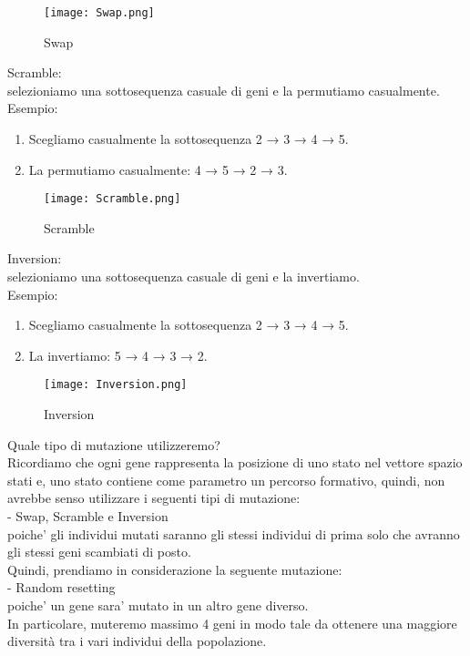 \documentclass[10pt,a4paper]{article}
\begin{document}
    \begin{figure}[h!]
      \centering
      \caption{Swap}
      \texttt{[image: Swap.png]}
      \label{Swap}
    \end{figure}
    
    Scramble:\\
    selezioniamo una sottosequenza casuale di geni e la permutiamo casualmente.
    Esempio:\\
    \begin{enumerate}
      \item Scegliamo casualmente la sottosequenza 2 → 3 → 4 → 5.
      \item La permutiamo casualmente: 4 → 5 → 2 → 3.
    \end{enumerate}
    \begin{figure}[h!]
      \centering
      \caption{Scramble}
      \texttt{[image: Scramble.png]}
      \label{Scramble}
    \end{figure}
     
    Inversion:\\
    selezioniamo una sottosequenza casuale di geni e la invertiamo.\\
    Esempio:\\
    \begin{enumerate}
      \item Scegliamo casualmente la sottosequenza 2 → 3 → 4 → 5.
      \item La invertiamo: 5 → 4 → 3 → 2.
    \end{enumerate}
    \begin{figure}[h!]
      \centering
      \caption{Inversion}
      \texttt{[image: Inversion.png]}
      \label{Inversion}
    \end{figure}
    
    Quale tipo di mutazione utilizzeremo?\\
    Ricordiamo che ogni gene rappresenta la posizione di uno stato nel vettore spazio stati e, uno stato contiene come parametro 
    un percorso formativo, quindi, non avrebbe senso utilizzare i seguenti tipi di mutazione:\\
    - Swap, Scramble e Inversion\\
    poiche' gli individui mutati saranno gli stessi individui di prima solo che avranno gli stessi geni scambiati di posto.\\
    Quindi, prendiamo in considerazione la seguente mutazione:\\
    - Random resetting\\
    poiche' un gene sara' mutato in un altro gene diverso.\\
    In particolare, muteremo massimo 4 geni in modo tale da ottenere una maggiore diversità tra i vari individui della popolazione.
    
\end{document}

